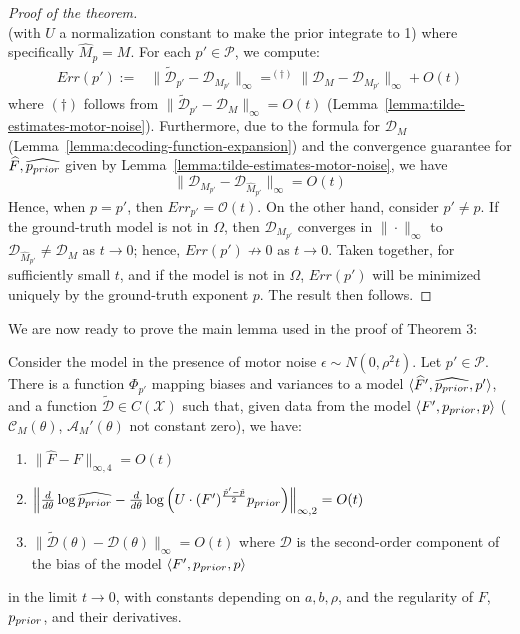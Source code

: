 \begin{proof}[Proof of the theorem]
\begin{equation}
\end{equation}
(with $U$ a normalization constant to make the prior integrate to 1)
where specifically $\hat{M}_p = M$.
For each $p' \in \mathcal{P}$, we compute:
\begin{align*}
    Err({p'}) := & \|\tilde{\mathcal{D}}_{p'} - \mathcal{D}_{M_{p'}}\|_\infty 
     =^{(\dagger)} \|\mathcal{D}_{M} - \mathcal{D}_{M_{p'}}\|_\infty + O(t)
\end{align*}
where $(\dagger)$ follows from $\|\tilde{\mathcal{D}}_{p'} - \mathcal{D}_M\|_\infty = O(t)$ (Lemma~\ref{lemma:tilde-estimates-motor-noise}).
Furthermore, due to the formula for $\mathcal{D}_M$ (Lemma~\ref{lemma:decoding-function-expansion}) and the convergence guarantee for $\widehat{F}, \widehat{p_{prior}}$ given by Lemma~\ref{lemma:tilde-estimates-motor-noise}, we have
\begin{equation}
    \|\mathcal{D}_{M_{p'}} - \mathcal{D}_{\hat{M}_{p'}}\|_\infty = O(t)
\end{equation}
Hence, when $p=p'$, then $Err_{p'} = \mathcal{O}(t)$.
On the other hand, consider $p'\neq p$.
If the ground-truth model is not in $\Omega$, then $\mathcal{D}_{M_{p'}}$ converges in $\|\cdot\|_\infty$ to $\mathcal{D}_{\hat{M}_{p'}} \neq \mathcal{D}_M$ as $t\rightarrow 0$; hence, $Err({p'}) \not\rightarrow 0$ as $t\rightarrow 0$.
Taken together, for sufficiently small $t$, and if the model is not in $\Omega$, $Err({p'})$ will be minimized uniquely by the ground-truth exponent $p$.
The result then follows.
\end{proof}


We are now ready to prove the main lemma used in the proof of Theorem 3:
\begin{lemma}\label{lemma:tilde-estimates-motor-noise}
Consider the model in the presence of motor noise $\epsilon \sim N(0,\rho^2t)$.
Let $p' \in \mathcal{P}$.
There is a function $\Phi_{p'}$ mapping biases and variances to a model $\langle \widehat{F}', \widehat{p_{prior}}, p'\rangle$, and a function $\tilde{\mathcal{D}} \in C(\mathcal{X})$ such that, given data from the model $\langle F', p_{prior}, p\rangle$ ($\mathcal{C}_M(\theta)$, $\mathcal{A}_M'(\theta)$ not constant zero), we have: 
\begin{enumerate}
    \item $\|\widehat{F} - F\|_{\infty,4} = O(t)$

\item $\left\|\frac{d}{d\theta}\log\widehat{p_{prior}}-\frac{d}{d\theta}\log\left(U\cdot (F')^{\frac{\tilde p'-\tilde p}{2}}p_{prior}\right)\right\|_{\infty,2} = O(t)$


    \item $\|\tilde{\mathcal{D}}(\theta) - \mathcal{D}(\theta)\|_\infty = O(t)$ where $\mathcal{D}$ is the second-order component of the bias of the model $\langle F', p_{prior}, p\rangle$
\end{enumerate}
in the limit $t \rightarrow 0$, with constants depending on $a, b, \rho$, and the regularity of $F$, $p_{prior}$, and their derivatives. 


\end{lemma}

